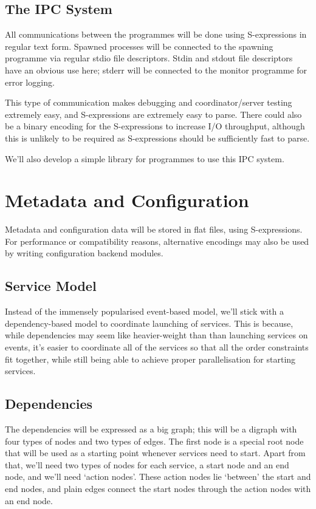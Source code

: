 \documentclass[a4paper,twoside,titlepage]{article}
\begin{document}
\subsection{The IPC System}
All communications between the programmes will be done using S-expressions in
regular text form. Spawned processes will be connected to the spawning programme
via regular stdio file descriptors. Stdin and stdout file descriptors have an
obvious use here; stderr will be connected to the monitor programme for error
logging.

This type of communication makes debugging and coordinator/server testing
extremely easy, and S-expressions are extremely easy to parse. There could also
be a binary encoding for the S-expressions to increase I/O throughput, although
this is unlikely to be required as S-expressions should be sufficiently fast to
parse.

We'll also develop a simple library for programmes to use this IPC system.

\section{Metadata and Configuration}
Metadata and configuration data will be stored in flat files, using
S-expressions. For performance or compatibility reasons, alternative encodings
may also be used by writing configuration backend modules.

\subsection{Service Model}
Instead of the immensely popularised event-based model, we'll stick with a
dependency-based model to coordinate launching of services. This is because,
while dependencies may seem like heavier-weight than than launching services on
events, it's easier to coordinate all of the services so that all the order
constraints fit together, while still being able to achieve proper
parallelisation for starting services.

\subsection{Dependencies}
The dependencies will be expressed as a big graph; this will be a digraph with
four types of nodes and two types of edges. The first node is a special root
node that will be used as a starting point whenever services need to start.
Apart from that, we'll need two types of nodes for each service, a start node
and an end node, and we'll need `action nodes'. These action nodes lie `between'
the start and end nodes, and plain edges connect the start nodes through the
action nodes with an end node.
\end{document}
